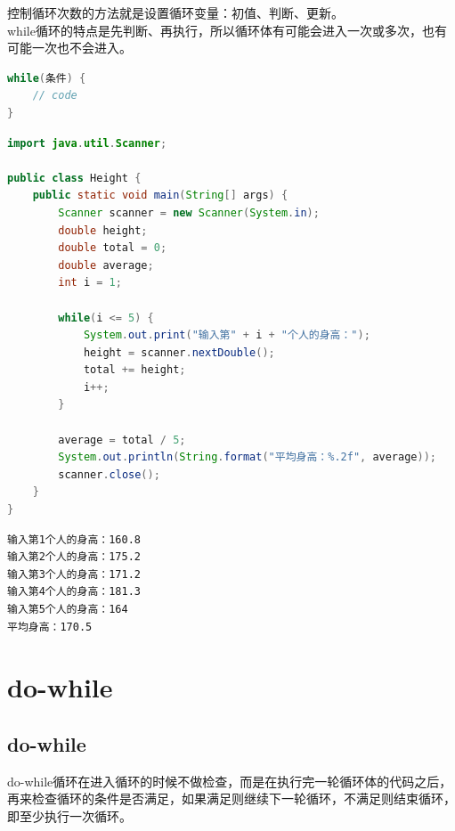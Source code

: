 控制循环次数的方法就是设置循环变量：初值、判断、更新。 \\

while循环的特点是先判断、再执行，所以循环体有可能会进入一次或多次，也有可能一次也不会进入。

\vspace{-0.5cm}

\begin{lstlisting}[language=Java]
while(条件) {
    // code
}
\end{lstlisting}

\vspace{0.5cm}


\begin{lstlisting}[language=Java]
import java.util.Scanner;

public class Height {
    public static void main(String[] args) {
        Scanner scanner = new Scanner(System.in);
        double height;
        double total = 0;
        double average;
        int i = 1;
        
        while(i <= 5) {
            System.out.print("输入第" + i + "个人的身高：");
            height = scanner.nextDouble();
            total += height;
            i++;
        }
        
        average = total / 5;
        System.out.println(String.format("平均身高：%.2f", average));
        scanner.close();
    }
}
\end{lstlisting}

\begin{tcolorbox}
	\begin{verbatim}
输入第1个人的身高：160.8
输入第2个人的身高：175.2
输入第3个人的身高：171.2
输入第4个人的身高：181.3
输入第5个人的身高：164
平均身高：170.5
    \end{verbatim}
\end{tcolorbox}

\newpage

\section{do-while}

\subsection{do-while}

do-while循环在进入循环的时候不做检查，而是在执行完一轮循环体的代码之后，再来检查循环的条件是否满足，如果满足则继续下一轮循环，不满足则结束循环，即至少执行一次循环。 \\

